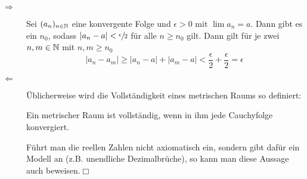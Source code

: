 \begin{description}
	\item[\glqq$\Rightarrow$\grqq] Sei $(a_n)_{n\in\mathbb{N}}$ eine konvergente Folge und $\epsilon>0$ mit $\lim a_n=a$. Dann gibt es ein $n_0$, sodass $|a_n-a|<\sfrac\epsilon2$ für alle $n\geq n_0$ gilt. Dann gilt für je zwei $n,m\in\mathbb{N}$ mit $n,m\geq n_0$
	\begin{equation*}
		|a_n-a_m|\geq |a_n-a|+|a_m-a|<\frac\epsilon2+\frac\epsilon2=\epsilon
	\end{equation*}

	\item[\glqq$\Leftarrow$\grqq] Üblicherweise wird die Vollständigkeit eines metrischen Raums so definiert:

	\glqq Ein metrischer Raum ist vollständig, wenn in ihm jede Cauchyfolge konvergiert.\grqq

	Führt man die reellen Zahlen nicht axiomatisch ein, sondern gibt dafür ein Modell an (z.B. unendliche Dezimalbrüche), so kann man diese Aussage auch beweisen.\hfill$\Box$
\end{description}
